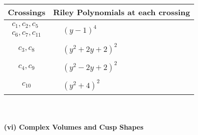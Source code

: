 \documentclass[1p]{elsarticle_modified}
\theoremstyle{definition}
\begin{document}
\begin{tabular}{m{50pt}|m{274pt}}
Crossings & \hspace{64pt}Riley Polynomials at each crossing \\
\hline $$\begin{aligned}c_{1},c_{2},c_{5}\\c_{6},c_{7},c_{11}\end{aligned}$$&$\begin{aligned}
&(y-1)^4
\end{aligned}$\\
\hline $$\begin{aligned}c_{3},c_{8}\end{aligned}$$&$\begin{aligned}
&(y^2+2 y+2)^2
\end{aligned}$\\
\hline $$\begin{aligned}c_{4},c_{9}\end{aligned}$$&$\begin{aligned}
&(y^2-2 y+2)^2
\end{aligned}$\\
\hline $$\begin{aligned}c_{10}\end{aligned}$$&$\begin{aligned}
&(y^2+4)^2
\end{aligned}$\\
\hline
\end{tabular}\\~\\
\newpage\flushleft \textbf{(vi) Complex Volumes and Cusp Shapes}
\end{document}
